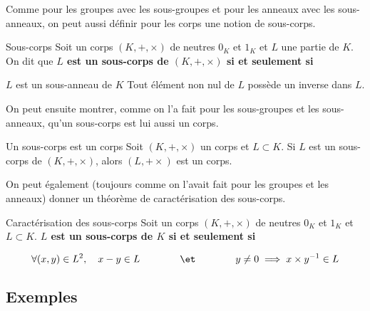 \documentclass[a4paper,french,bookmarks]{article}
\begin{document}
Comme pour les groupes avec les sous-groupes et pour les anneaux avec les sous-anneaux, on peut aussi définir pour les corps une notion de sous-corps.

\begin{definition}{Sous-corps}{}
    Soit un corps $(K, +, \times)$ de neutres $0_K$ et $1_K$ et $L$ une partie de $K$. On dit que \bf{$L$ est un sous-corps de $(K, +, \times)$} si et seulement si
    
    \begin{enumerate}
        \ithand $L$ est un sous-anneau de $K$
        \ithand Tout élément non nul de $L$ possède un inverse dans $L$.
    \end{enumerate}
\end{definition}

On peut ensuite montrer, comme on l'a fait pour les sous-groupes et les sous-anneaux, qu'un sous-corps est lui aussi un corps.

\begin{property}{Un sous-corps est un corps}{}
    Soit $(K, +, \times)$ un corps et $L \subset K$. Si $L$ est un sous-corps de $(K, +, \times)$, alors $(L, + \times)$ est un corps.
\end{property}


On peut également (toujours comme on l'avait fait pour les groupes et les anneaux) donner un théorème de caractérisation des sous-corps.

\begin{theorem}{Caractérisation des sous-corps}{}
     Soit un corps $(K, +, \times)$ de neutres $0_K$ et $1_K$ et $L \subset K$. \bf{$L$ est un sous-corps de $K$} si et seulement si
     
     \[ \forall (x, y) \in L^2,\quad x-y \in L\qquad\qquad\et\qquad\qquad y \neq 0 \implies x\times y^{-1} \in L\]
\end{theorem}


\subsection{Exemples}
\end{document}

